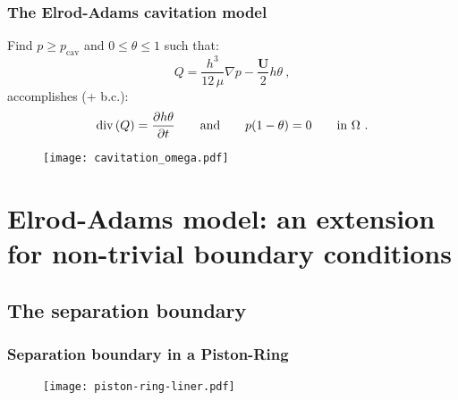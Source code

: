 \documentclass[10pt,aspectratio=169]{beamer}
\begin{document}



\begin{frame}
\frametitle{The Elrod-Adams cavitation model}
\vspace*{1.0cm}
Find $p\geq p_{\text{cav}}$ and $0\leq \theta \leq 1$ such that: $$Q=\frac{h^3}{12\,\mu} \nabla p - \frac{\mathbf{U}}{2}h\theta~,$$ accomplishes (+ b.c.): $$\text{div} \left( Q \right) =\frac{\partial h\theta }{\partial t}\qquad \mbox{and}\qquad p(1-\theta)=0 \qquad \mbox{in }  \Omega~.$$

\begin{figure}
	\centering
	\texttt{[image: cavitation\_omega.pdf]}
\end{figure}
\end{frame}


\setcounter{showSlideNumbers}{0}
\section{Elrod-Adams model: an extension for non-trivial boundary conditions}
\subsection{The separation boundary}
\begin{frame}[noframenumbering]

\tableofcontents[
currentsection,
currentsubsection,
subsectionstyle=show/shaded/hide
]
\end{frame}
\setcounter{showSlideNumbers}{1}

\begin{frame}
\frametitle{Separation boundary in a Piston-Ring}
\vspace*{1.0cm}
\begin{figure}
	\centering
	\texttt{[image: piston-ring-liner.pdf]}
\end{figure}
\end{frame}
\end{document}
